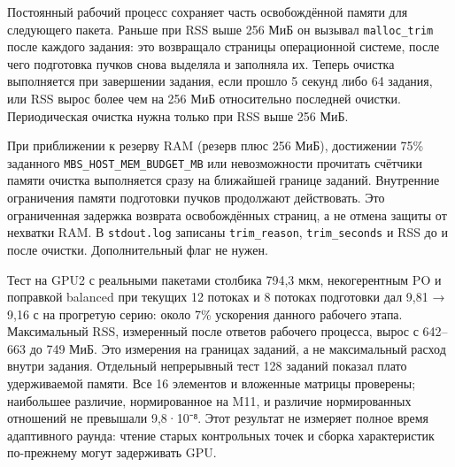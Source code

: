 Постоянный рабочий процесс сохраняет часть освобождённой памяти для
следующего пакета. Раньше при RSS выше 256 МиБ он вызывал
\nolinkurl{malloc_trim} после каждого задания: это возвращало страницы
операционной системе, после чего подготовка пучков снова выделяла и
заполняла их. Теперь очистка выполняется при завершении задания, если
прошло 5 секунд либо 64 задания, или RSS вырос более чем на 256 МиБ
относительно последней очистки. Периодическая очистка нужна только при
RSS выше 256 МиБ.

При приближении к резерву RAM (резерв плюс 256 МиБ), достижении 75\%
заданного \nolinkurl{MBS_HOST_MEM_BUDGET_MB} или невозможности
прочитать счётчики памяти очистка выполняется сразу на ближайшей границе
заданий. Внутренние ограничения памяти подготовки пучков продолжают
действовать. Это ограниченная задержка возврата освобождённых страниц, а
не отмена защиты от нехватки RAM. В \texttt{stdout.log} записаны
\nolinkurl{trim_reason}, \nolinkurl{trim_seconds} и RSS до и после очистки.
Дополнительный флаг не нужен.

Тест на GPU2 с реальными пакетами столбика 794,3 мкм, некогерентным PO и
поправкой balanced при текущих 12 потоках и 8 потоках подготовки дал
9,81 → 9,16 с на прогретую серию: около 7\% ускорения данного рабочего
этапа. Максимальный RSS, измеренный после ответов рабочего процесса,
вырос с 642--663 до 749 МиБ. Это измерения на границах заданий, а не
максимальный расход внутри задания. Отдельный непрерывный тест 128
заданий показал плато удерживаемой памяти. Все 16 элементов и вложенные
матрицы проверены; наибольшее различие, нормированное на M11, и различие
нормированных отношений не превышали 9,8·10⁻⁸. Этот результат не
измеряет полное время адаптивного раунда: чтение старых контрольных
точек и сборка характеристик по-прежнему могут задерживать GPU.
